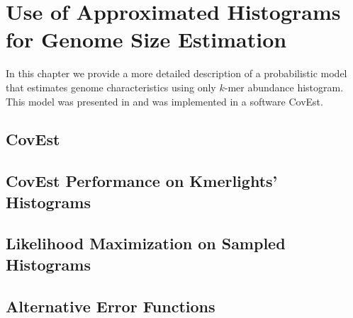 \chapter{Use of Approximated Histograms for Genome Size Estimation}
\label{sec:chapter3}
In this chapter we provide a more detailed description of a probabilistic model
that estimates genome characteristics using only $k$-mer abundance histogram.
This model was presented in \cite{Hozza2015, Hozza2016} and was implemented in a software CovEst.

\section{CovEst}
\label{sec:covest}

\section{CovEst Performance on Kmerlights' Histograms}

\section{Likelihood Maximization on Sampled Histograms}
\label{sec:kmerlight-errors}

\section{Alternative Error Functions}
